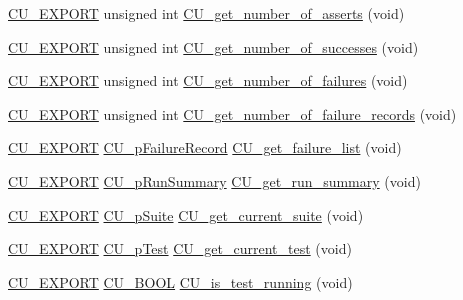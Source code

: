 \begin{DoxyCompactItemize}
\item 
\hyperlink{group___framework_ga22e538403fdee24be3388ab473fe64d5}{C\+U\+\_\+\+E\+X\+P\+O\+R\+T} unsigned int \hyperlink{group___framework_ga2ac4bd2bd80e94b1288a472b12ee9931}{C\+U\+\_\+get\+\_\+number\+\_\+of\+\_\+asserts} (void)
\item 
\hyperlink{group___framework_ga22e538403fdee24be3388ab473fe64d5}{C\+U\+\_\+\+E\+X\+P\+O\+R\+T} unsigned int \hyperlink{group___framework_ga56d72dc7bd4c976194c71f144bda75bf}{C\+U\+\_\+get\+\_\+number\+\_\+of\+\_\+successes} (void)
\item 
\hyperlink{group___framework_ga22e538403fdee24be3388ab473fe64d5}{C\+U\+\_\+\+E\+X\+P\+O\+R\+T} unsigned int \hyperlink{group___framework_ga5715f679af053504c7c74c4dc67f00d8}{C\+U\+\_\+get\+\_\+number\+\_\+of\+\_\+failures} (void)
\item 
\hyperlink{group___framework_ga22e538403fdee24be3388ab473fe64d5}{C\+U\+\_\+\+E\+X\+P\+O\+R\+T} unsigned int \hyperlink{group___framework_ga359a5f43045406d42978b5d7a9bd4632}{C\+U\+\_\+get\+\_\+number\+\_\+of\+\_\+failure\+\_\+records} (void)
\item 
\hyperlink{group___framework_ga22e538403fdee24be3388ab473fe64d5}{C\+U\+\_\+\+E\+X\+P\+O\+R\+T} \hyperlink{group___framework_gafe3d04f76bf2fac18a3b6a9fd9368308}{C\+U\+\_\+p\+Failure\+Record} \hyperlink{group___framework_ga29e70990caa96ba6570bd6503650c4e7}{C\+U\+\_\+get\+\_\+failure\+\_\+list} (void)
\item 
\hyperlink{group___framework_ga22e538403fdee24be3388ab473fe64d5}{C\+U\+\_\+\+E\+X\+P\+O\+R\+T} \hyperlink{group___framework_gad47d258dca538a934dccaeab9392b391}{C\+U\+\_\+p\+Run\+Summary} \hyperlink{group___framework_gad51994a28ffa19ba06b6c803d2796d94}{C\+U\+\_\+get\+\_\+run\+\_\+summary} (void)
\item 
\hyperlink{group___framework_ga22e538403fdee24be3388ab473fe64d5}{C\+U\+\_\+\+E\+X\+P\+O\+R\+T} \hyperlink{group___framework_gaba832ae8b235f5e70d6a4ac9c3bb1219}{C\+U\+\_\+p\+Suite} \hyperlink{group___framework_ga18a515b080595137afe72034c387e7dd}{C\+U\+\_\+get\+\_\+current\+\_\+suite} (void)
\item 
\hyperlink{group___framework_ga22e538403fdee24be3388ab473fe64d5}{C\+U\+\_\+\+E\+X\+P\+O\+R\+T} \hyperlink{group___framework_ga249c43fbe4e53452b3f90db1437da04b}{C\+U\+\_\+p\+Test} \hyperlink{group___framework_ga71bd5fb9588620f3c73afbbc526a06fb}{C\+U\+\_\+get\+\_\+current\+\_\+test} (void)
\item 
\hyperlink{group___framework_ga22e538403fdee24be3388ab473fe64d5}{C\+U\+\_\+\+E\+X\+P\+O\+R\+T} \hyperlink{group___framework_gabd98d449e979a6379b06551242106dd4}{C\+U\+\_\+\+B\+O\+O\+L} \hyperlink{group___framework_gad971fa22c8d1349f9d0b97bc95577cb9}{C\+U\+\_\+is\+\_\+test\+\_\+running} (void)

\end{DoxyCompactItemize}
